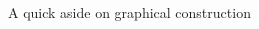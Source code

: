 \documentclass[notes,11pt, aspectratio=169]{beamer}
\begin{document}
\begin{frame}{A quick aside on graphical construction}
\begin{columns}[onlytextwidth, T]
\begin{column}{.5\textwidth}
    \end{column}%
  \end{columns}
\end{frame}
\end{document}
